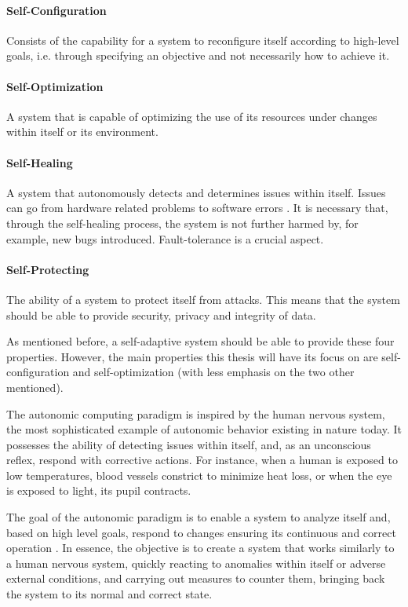 \paragraph{Self-Configuration} Consists of the capability for a system to reconfigure itself according to high-level goals, i.e. through specifying an objective and not necessarily how to achieve it. 
\paragraph{Self-Optimization} A system that is capable of optimizing the use of its resources under changes within itself or its environment.
\paragraph{Self-Healing} A system that autonomously detects and determines issues within itself. Issues can go from hardware related problems to software errors \cite{Paulson2002}. It is necessary that, through the self-healing process, the system is not further harmed by, for example, new bugs introduced. Fault-tolerance is a crucial aspect.
\paragraph{Self-Protecting} The ability of a system to protect itself from attacks. This means that the system should be able to provide security, privacy and integrity of data.
\par As mentioned before, a self-adaptive system should be able to provide these four properties. However, the main properties this thesis will have its focus on are self-configuration and self-optimization (with less emphasis on the two other mentioned). 
\par The autonomic computing paradigm is inspired by the human nervous system, the most sophisticated example of autonomic behavior existing in nature today. It possesses the ability of detecting issues within itself, and, as an unconscious reflex, respond with corrective actions. For instance, when a human is exposed to low temperatures, blood vessels constrict to minimize heat loss, or when the eye is exposed to light, its pupil contracts.
\par The goal of the autonomic paradigm is to enable a system to analyze itself and, based on high level goals, respond to changes ensuring its continuous and correct operation \cite{Parashar2005}. In essence, the objective is to create a system that works similarly to a human nervous system, quickly reacting to anomalies within itself or adverse external conditions, and carrying out measures to counter them, bringing back the system to its normal and correct state.
%
%
%
